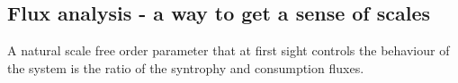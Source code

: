 \documentclass[12pt, titlepage]{report}
\begin{document}

\subsection{Flux analysis - a way to get a sense of scales}
A natural scale free order parameter that at first sight controls the behaviour of the system is the ratio of the syntrophy and consumption fluxes.
\end{document}
